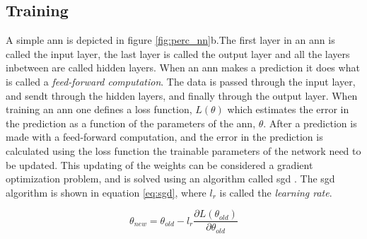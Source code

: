 \subsection{Training} \label{sec:nn_training}
A simple \acrshort{ann} is depicted in figure \ref{fig:perc_nn}b.The first layer in an \acrshort{ann} is called the input layer, the last layer is called the output layer and all the layers inbetween are called hidden layers. When an \acrshort{ann} makes a prediction it does what is called a \textit{feed-forward computation}. The data is passed through the input layer, and sendt through the hidden layers, and finally through the output layer. When training an \acrshort{ann} one defines a loss function, $L(\theta)$ which estimates the error in the prediction as a function of the parameters of the \acrshort{ann}, $\theta$. After a prediction is made with a feed-forward computation, and the error in the prediction is calculated using the loss function the trainable parameters of the network need to be updated. This updating of the weights can be considered a gradient optimization problem, and is solved using an algorithm called \acrfull{sgd} \cite{dl_book}. The \acrshort{sgd} algorithm is shown in equation \eqref{eq:sgd}, where $l_r$ is called the \textit{learning rate}.

\begin{equation}
    \theta_{new} = \theta_{old} - l_r \frac{\partial L(\theta_{old})}{\partial \theta_{old}}
    \label{eq:sgd}
\end{equation}


